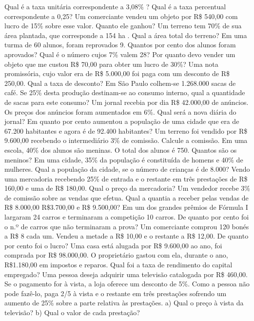 \begin{exercicios}
        \exitem{} Qual é a taxa unitária correspondente a 3,08\% ?
        \exitem{} Qual é a taxa percentual correspondente a 0,25?		
        \exitem{} Um comerciante vendeu um objeto por R\$ 540,00 com lucro de 15\% sobre esse valor. Quanto ele ganhou?
        \exitem{} Um terreno tem 70\% de sua área plantada, que corresponde a 154 ha . Qual a área total do terreno?
        \exitem{} Em uma turma de 60 alunos, foram reprovados 9. Quantos por cento dos alunos foram aprovados?
        \exitem{} Qual é o número cujos 7\% valem 28?		
        \exitem{} Por quanto devo vender um objeto que me custou R\$ 70,00 para obter um lucro de 30\%?
        \exitem{} Uma nota promissória, cujo valor era de R\$ 5.000,00 foi paga com um desconto de R\$ 250,00. Qual a taxa de desconto? 
        \exitem{} Em São Paulo colhem-se 1.268.000 sacas de café. Se 25\% desta produção destinam-se ao consumo interno, qual a quantidade de sacas para este consumo?	
        \exitem{} Um jornal recebia por dia R\$ 42.000,00 de anúncios. Os preços dos anúncios foram aumentados em 6\%. Qual será a nova diária do jornal?	
        \exitem{} Em quanto por cento aumentou a população de uma cidade que era de 67.200 habitantes e agora é de 92.400 habitantes? 	
        \exitem{} Um terreno foi vendido por R\$ 9.600,00 recebendo o intermediário 3\% de comissão. Calcule a comissão.	
        \exitem{} Em uma escola, 40\% dos alunos são meninas. O total dos alunos é 750. Quantos são os meninos?
        \exitem{} Em uma cidade, 35\% da população é constituída de homens e 40\% de mulheres. Qual a população da cidade, se o número de crianças é de 8.000?	
        \exitem{} Vendo uma mercadoria recebendo 25\% de entrada e o restante em três prestações de R\$ 160,00 e uma de R\$ 180,00. Qual o preço da mercadoria?	
        \exitem{} Um vendedor recebe 3\% de comissão sobre as vendas que efetua. Qual a quantia a receber pelas vendas de R\$ 8.000,00 R\$3.700,00 e R\$ 9.500,00?		
        \exitem{} Em um dos grandes prêmios de Fórmula I largaram 24 carros e terminaram a competição 10 carros. De quanto por cento foi o n.º de carros que não terminaram a prova?
        \exitem{} Um comerciante comprou 120 bonés a R\$ 8 cada um. Vendeu a metade a R\$ 10,00 e o restante a R\$ 12,00. De quanto por cento foi o lucro?
        \exitem{} Uma casa está alugada por R\$ 9.600,00 ao ano, foi comprada por R\$ 98.000,00. O proprietário gastou com ela, durante o ano, R\$1.180,00 em impostos e reparos. Qual foi a taxa de rendimento do capital empregado?
        \exitem{} Uma pessoa deseja adquirir uma televisão catalogada por R\$ 460,00. Se o pagamento for à vista, a loja oferece um desconto de 5\%. Como a pessoa não pode fazê-lo, paga 2/5 à vista e o restante em três prestações sofrendo um aumento de 25\% sobre a parte relativa às prestações.
    	a) Qual o preço à vista da televisão?	
    	b) Qual o valor de cada prestação?	


\end{exercicios}
